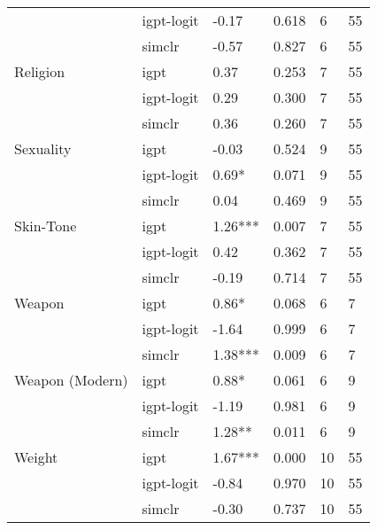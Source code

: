 \begin{tabular}{llllll}
       & igpt-logit &    -0.17 &  0.618 &     6 &    55 \\
       & simclr &    -0.57 &  0.827 &     6 &    55 \\
Religion & igpt &     0.37 &  0.253 &     7 &    55 \\
       & igpt-logit &     0.29 &  0.300 &     7 &    55 \\
       & simclr &     0.36 &  0.260 &     7 &    55 \\
Sexuality & igpt &    -0.03 &  0.524 &     9 &    55 \\
       & igpt-logit &    0.69* &  0.071 &     9 &    55 \\
       & simclr &     0.04 &  0.469 &     9 &    55 \\
Skin-Tone & igpt &  1.26*** &  0.007 &     7 &    55 \\
       & igpt-logit &     0.42 &  0.362 &     7 &    55 \\
       & simclr &    -0.19 &  0.714 &     7 &    55 \\
Weapon & igpt &    0.86* &  0.068 &     6 &     7 \\
       & igpt-logit &    -1.64 &  0.999 &     6 &     7 \\
       & simclr &  1.38*** &  0.009 &     6 &     7 \\
Weapon (Modern) & igpt &    0.88* &  0.061 &     6 &     9 \\
       & igpt-logit &    -1.19 &  0.981 &     6 &     9 \\
       & simclr &   1.28** &  0.011 &     6 &     9 \\
Weight & igpt &  1.67*** &  0.000 &    10 &    55 \\
       & igpt-logit &    -0.84 &  0.970 &    10 &    55 \\
       & simclr &    -0.30 &  0.737 &    10 &    55 \\
\bottomrule
\end{tabular}
